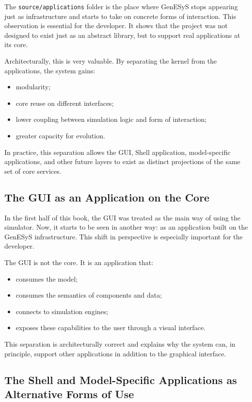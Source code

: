 The \texttt{source/applications} folder is the place where GenESyS stops appearing just as infrastructure and starts to take on concrete forms of interaction. This observation is essential for the developer. It shows that the project was not designed to exist just as an abstract library, but to support real applications at its core.

Architecturally, this is very valuable. By separating the kernel from the applications, the system gains:
\begin{itemize}
 \item modularity;
 \item core reuse on different interfaces;
 \item lower coupling between simulation logic and form of interaction;
 \item greater capacity for evolution.
\end{itemize}

In practice, this separation allows the GUI, Shell application, model-specific applications, and other future layers to exist as distinct projections of the same set of core services.

\subsection{The GUI as an Application on the Core}
\label{subsec:cap10_gui_como_aplicacao_sobre_nucleo}

In the first half of this book, the GUI was treated as the main way of using the simulator. Now, it starts to be seen in another way: as an application built on the GenESyS infrastructure. This shift in perspective is especially important for the developer.

The GUI is not the core. It is an application that:
\begin{itemize}
 \item consumes the model;
 \item consumes the semantics of components and data;
 \item connects to simulation engines;
 \item exposes these capabilities to the user through a visual interface.
\end{itemize}

This separation is architecturally correct and explains why the system can, in principle, support other applications in addition to the graphical interface.

\subsection{The Shell and Model-Specific Applications as Alternative Forms of Use}
\label{subsec:cap10_shell_modelspecific_forma_alternativa}

